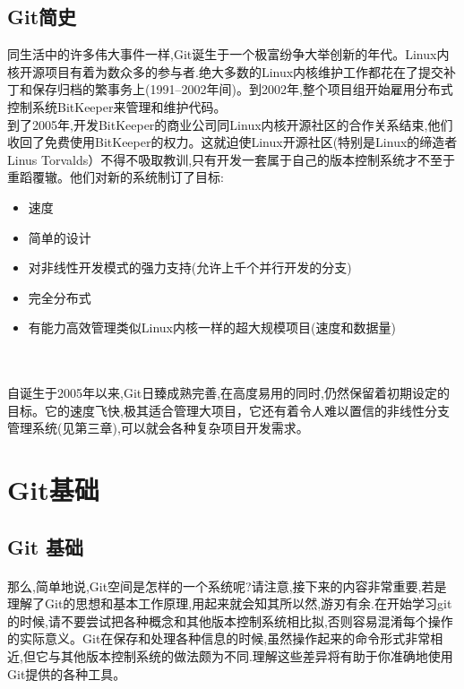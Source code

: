 \documentclass{book}
\begin{document}
	\subsection{Git简史}
	同生活中的许多伟大事件一样,Git诞生于一个极富纷争大举创新的年代。Linux内核开源项目有着为数众多的参与者.绝大多数的Linux内核维护工作都花在了提交补丁和保存归档的繁事务上(1991--2002年间)。到2002年,整个项目组开始雇用分布式控制系统BitKeeper来管理和维护代码。\\
	到了2005年,开发BitKeeper的商业公司同Linux内核开源社区的合作关系结束,他们收回了免费使用BitKeeper的权力。这就迫使Linux开源社区(特别是Linux的缔造者Linus Torvalds）不得不吸取教训,只有开发一套属于自己的版本控制系统才不至于重蹈覆辙。他们对新的系统制订了目标:\\
	\begin{itemize}
		\item 速度
		\item 简单的设计 
		\item 对非线性开发模式的强力支持(允许上千个并行开发的分支)
		\item 完全分布式
		\item 有能力高效管理类似Linux内核一样的超大规模项目(速度和数据量)
	\end{itemize}\\
	\paragraph{}
	自诞生于2005年以来,Git日臻成熟完善,在高度易用的同时,仍然保留着初期设定的目标。它的速度飞快,极其适合管理大项目，它还有着令人难以置信的非线性分支管理系统(见第三章),可以就会各种复杂项目开发需求。\\
	\section{Git基础}
	\subsection{Git 基础}
	\paragraph{}
	那么,简单地说,Git空间是怎样的一个系统呢?请注意,接下来的内容非常重要,若是理解了Git的思想和基本工作原理,用起来就会知其所以然,游刃有余.在开始学习git的时候,请不要尝试把各种概念和其他版本控制系统相比拟,否则容易混淆每个操作的实际意义。Git在保存和处理各种信息的时候,虽然操作起来的命令形式非常相近,但它与其他版本控制系统的做法颇为不同.理解这些差异将有助于你准确地使用Git提供的各种工具。\\
\end{document}
